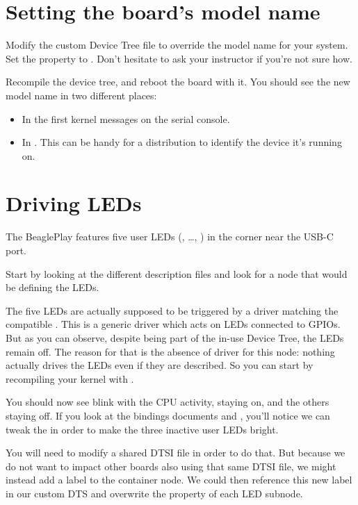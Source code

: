 \section{Setting the board's model name}

Modify the custom Device Tree file to override the model name for your
system. Set the  property to . Don't hesitate to ask your instructor if you're not sure how.

Recompile the device tree, and reboot the board with it. You should see
the new model name in two different places:

\begin{itemize}
\item In the first kernel messages on the serial console.
\item In . This can be
      handy for a distribution to identify the device it's running on.
\end{itemize}

\section{Driving LEDs}

The BeaglePlay features five user LEDs (, \ldots, )
in the corner near the USB-C port.

Start by looking at the different description files and look for a node
that would be defining the LEDs.

The five LEDs are actually supposed to be triggered by a driver matching
the compatible . This is a generic driver which acts on
LEDs connected to GPIOs. But as you can observe, despite being part of
the in-use Device Tree, the LEDs remain off. The reason for that is the
absence of driver for this node: nothing actually drives the LEDs even
if they are described. So you can start by recompiling your kernel with
.

You should now see  blink with the CPU activity, 
staying on, and the others staying off. If you look at the bindings documents
 and
, you'll notice we
can tweak the  in order to make the three inactive user
LEDs bright.

You will need to modify a shared DTSI file in order to do that. But
because we do not want to impact other boards also using that same DTSI
file, we might instead add a label to the  container node. We
could then reference this new label in our custom DTS and overwrite the
 property of each LED subnode.

